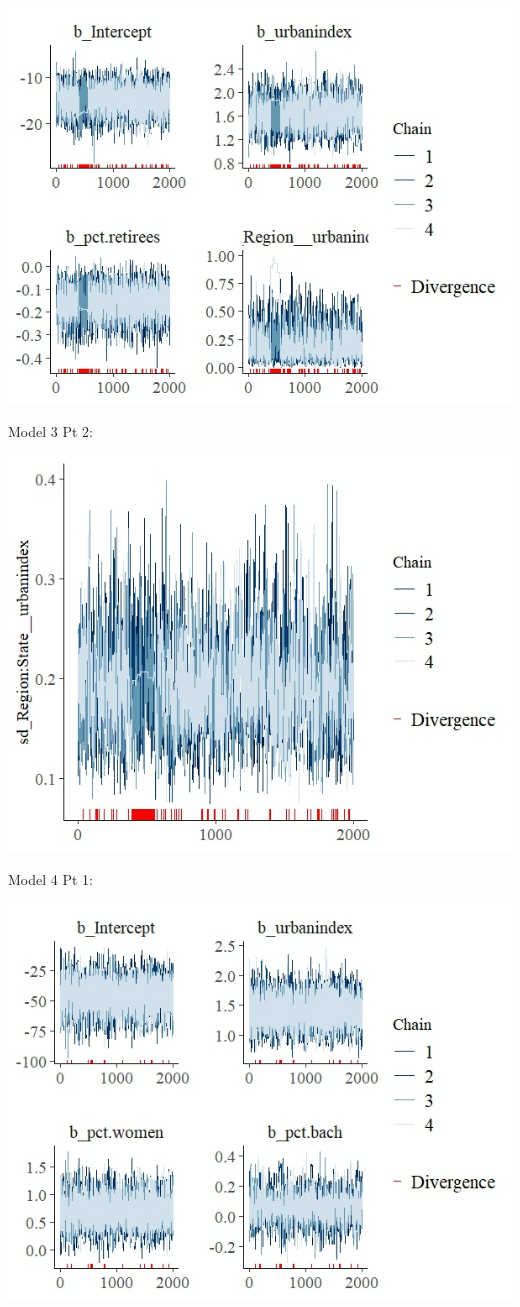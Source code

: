 \documentclass[12pt]{article}
\begin{document}
\includegraphics[scale = 1.25]{trace_plots/trace_model3_part1.jpeg}


Model 3 Pt 2: 

\includegraphics[scale = 1.25]{trace_plots/trace_model3_part2.jpeg}

Model 4 Pt 1:

\includegraphics[scale = 1.3]{trace_plots/trace_model4_part1.jpeg}
\end{document}
